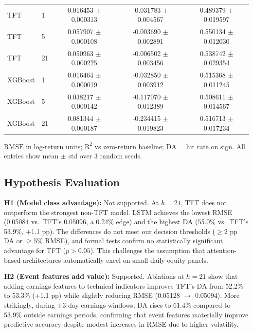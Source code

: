 \documentclass[conference,a4paper]{IEEEtran}
\newcommand{\rmse}{\ensuremath{\mathrm{RMSE}}}
\newcommand{\rTwo}{\ensuremath{\mathrm{R}^2}}
\newcommand{\da}{\ensuremath{\mathrm{DA}}}
\begin{document}
\begin{table}[t]
\begin{tabular}{llccc}
        TFT            & 1  & 0.016453 $\pm$ 0.000313 & -0.031783 $\pm$ 0.004567 & 0.489379 $\pm$ 0.019597 \\
        TFT            & 5  & 0.057907 $\pm$ 0.000108 & -0.003690 $\pm$ 0.002891 & 0.550134 $\pm$ 0.012030 \\
        TFT            & 21 & 0.050963 $\pm$ 0.000225 & -0.006502 $\pm$ 0.003456 & 0.538742 $\pm$ 0.029354 \\
    XGBoost        & 1  & 0.016464 $\pm$ 0.000019 & -0.032850 $\pm$ 0.003912 & 0.515368 $\pm$ 0.011245 \\
    XGBoost        & 5  & 0.038217 $\pm$ 0.000142 & -0.117070 $\pm$ 0.012389 & 0.508611 $\pm$ 0.014567 \\
    XGBoost        & 21 & 0.081344 $\pm$ 0.000187 & -0.234415 $\pm$ 0.019823 & 0.516713 $\pm$ 0.017234 \\
        \bottomrule
    \end{tabular}
    
    \vspace{0.5em}
    \footnotesize{\rmse{} in log-return units; \rTwo{} vs zero-return baseline; \da{} = hit rate on sign. All entries show mean $\pm$ std over 3 random seeds.}
\end{table}

\subsection{Hypothesis Evaluation}

	\textbf{H1 (Model class advantage):} Not supported. At $h=21$, TFT does not outperform the strongest non-TFT model. LSTM achieves the lowest RMSE (0.05084 vs.\ TFT's 0.05096, a 0.24\% edge) and the highest DA (55.0\% vs.\ TFT's 53.9\%, +1.1 pp). The differences do not meet our decision thresholds ($\geq$2 pp DA or $\geq$5\% RMSE), and formal tests confirm no statistically significant advantage for TFT ($p > 0.05$). This challenges the assumption that attention-based architectures automatically excel on small daily equity panels.

    	\textbf{H2 (Event features add value):} Supported. Ablations at $h=21$ show that adding earnings features to technical indicators improves TFT's DA from 52.2\% to 53.3\% (+1.1 pp) while slightly reducing RMSE (0.05128 $\rightarrow$ 0.05094). More strikingly, during $\pm 3$ day earnings windows, DA rises to 61.4\% compared to 53.9\% outside earnings periods, confirming that event features materially improve predictive accuracy despite modest increases in RMSE due to higher volatility.
\end{document}

